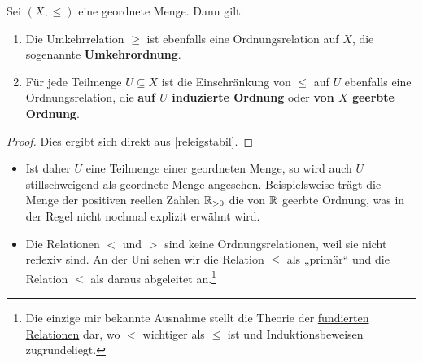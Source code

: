 \begin{satz} \label{umkehrordnung}
    Sei $(X,\le)$ eine geordnete Menge. Dann gilt:
    \begin{enumerate}
        \item Die Umkehrrelation $\ge$ ist ebenfalls eine Ordnungsrelation auf $X$, die sogenannte \textbf{Umkehrordnung}.
        \item Für jede Teilmenge $U\subseteq X$ ist die Einschränkung von $\le$ auf $U$ ebenfalls eine Ordnungsrelation, die \textbf{auf $U$ induzierte Ordnung} oder \textbf{von $X$ geerbte Ordnung}.
    \end{enumerate}
\end{satz}
\begin{proof}
    Dies ergibt sich direkt aus \cref{releigstabil}.
\end{proof}


\begin{bem} \quad
    \begin{itemize}
        \item Ist daher $U$ eine Teilmenge einer geordneten Menge, so wird auch $U$ stillschweigend als geordnete Menge angesehen. Beispielsweise trägt die Menge der positiven reellen Zahlen $\mathbb R_{>0}$ die von $\mathbb R$ geerbte Ordnung, was in der Regel nicht nochmal explizit erwähnt wird.
        \item Die Relationen $<$ und $>$ sind keine Ordnungsrelationen, weil sie nicht reflexiv sind. An der Uni sehen wir die Relation $\le$ als „primär“ und die Relation $<$ als daraus abgeleitet an.\footnote{Die einzige mir bekannte Ausnahme stellt die Theorie der \href{https://en.wikipedia.org/wiki/Well-founded_relation}{fundierten Relationen} dar, wo $<$ wichtiger als $\le$ ist und Induktionsbeweisen zugrundeliegt.}
    \end{itemize}
\end{bem}


